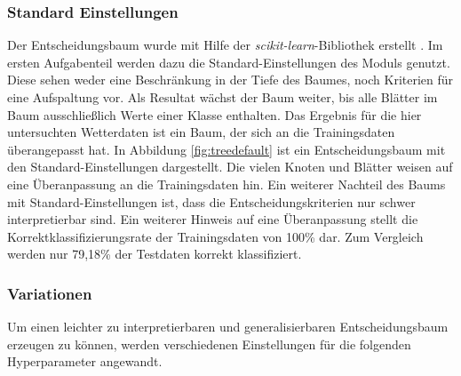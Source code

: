 \subsubsection{Standard Einstellungen}
Der Entscheidungsbaum wurde mit Hilfe der \emph{scikit-learn}-Bibliothek erstellt \cite{scikit-learn}. Im ersten Aufgabenteil werden dazu die Standard-Einstellungen des Moduls genutzt. Diese sehen weder eine Beschränkung in der Tiefe des Baumes, noch Kriterien für eine Aufspaltung vor. Als Resultat wächst der Baum weiter, bis alle Blätter im Baum ausschließlich Werte einer Klasse enthalten. Das Ergebnis für die hier untersuchten Wetterdaten ist ein Baum, der sich an die Trainingsdaten überangepasst hat. In Abbildung \ref{fig:treedefault} ist ein Entscheidungsbaum mit den Standard-Einstellungen dargestellt. Die vielen Knoten und Blätter weisen auf eine Überanpassung an die Trainingsdaten hin. Ein weiterer Nachteil des Baums mit Standard-Einstellungen ist, dass die Entscheidungskriterien nur schwer interpretierbar sind. Ein weiterer Hinweis auf eine Überanpassung stellt die Korrektklassifizierungsrate der Trainingsdaten von 100\% dar. Zum Vergleich werden nur 79,18\% der Testdaten korrekt klassifiziert.


\subsubsection{Variationen}
Um einen leichter zu interpretierbaren und generalisierbaren Entscheidungsbaum erzeugen zu können, werden verschiedenen Einstellungen für die folgenden Hyperparameter angewandt. 


